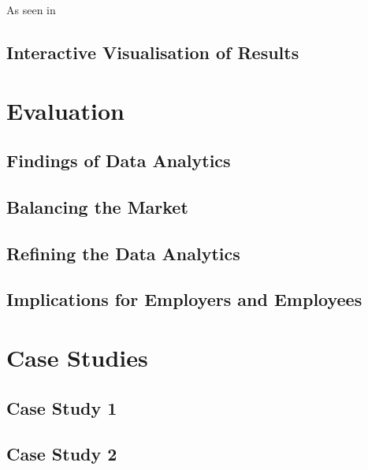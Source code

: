 \documentclass[twoside, 12pt, a4paper]{article}
\begin{document}
As seen in 

\newpage
\subsection{Interactive Visualisation of Results}

\newpage
\section{Evaluation}
\subsection{Findings of Data Analytics}
\subsection{Balancing the Market}
\subsection{Refining the Data Analytics}
\subsection{Implications for Employers and Employees}

\newpage
\section{Case Studies}
\subsection{Case Study 1}
\subsection{Case Study 2}
\end{document}

